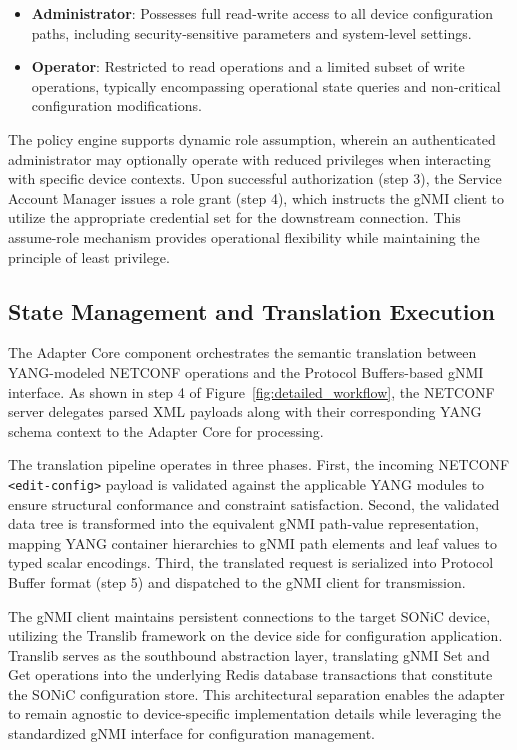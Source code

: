\documentclass[12pt, a4paper, reqno, oneside]{book}
\begin{document}
\begin{itemize}
    \item \textbf{Administrator}: Possesses full read-write access to all device configuration paths, including security-sensitive parameters and system-level settings.
    \item \textbf{Operator}: Restricted to read operations and a limited subset of write operations, typically encompassing operational state queries and non-critical configuration modifications.
\end{itemize}

The policy engine supports dynamic role assumption, wherein an authenticated administrator may optionally operate with reduced privileges when interacting with specific device contexts. Upon successful authorization (step 3), the Service Account Manager issues a role grant (step 4), which instructs the gNMI client to utilize the appropriate credential set for the downstream connection. This assume-role mechanism provides operational flexibility while maintaining the principle of least privilege.

\subsection{State Management and Translation Execution}
\label{sec:state_management}

The Adapter Core component orchestrates the semantic translation between YANG-modeled NETCONF operations and the Protocol Buffers-based gNMI interface. As shown in step 4 of Figure~\ref{fig:detailed_workflow}, the NETCONF server delegates parsed XML payloads along with their corresponding YANG schema context to the Adapter Core for processing.

The translation pipeline operates in three phases. First, the incoming NETCONF \texttt{<edit-config>} payload is validated against the applicable YANG modules to ensure structural conformance and constraint satisfaction. Second, the validated data tree is transformed into the equivalent gNMI path-value representation, mapping YANG container hierarchies to gNMI path elements and leaf values to typed scalar encodings. Third, the translated request is serialized into Protocol Buffer format (step 5) and dispatched to the gNMI client for transmission.

The gNMI client maintains persistent connections to the target SONiC device, utilizing the Translib framework on the device side for configuration application. Translib serves as the southbound abstraction layer, translating gNMI Set and Get operations into the underlying Redis database transactions that constitute the SONiC configuration store. This architectural separation enables the adapter to remain agnostic to device-specific implementation details while leveraging the standardized gNMI interface for configuration management.
\end{document}
